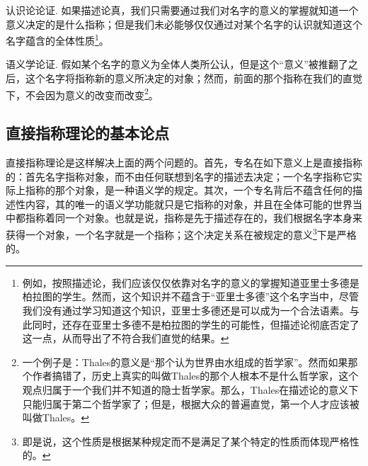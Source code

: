 \documentclass{article}
\begin{document}
{\kaishu 认识论论证.}  如果描述论真，我们只需要通过我们对名字的意义的掌握就知道一个意义决定的是什么指称；但是我们未必能够仅仅通过对某个名字的认识就知道这个名字蕴含的全体性质\footnote{例如，按照描述论，我们应该仅仅依靠对名字的意义的掌握知道亚里士多德是柏拉图的学生。然而，这个知识并不蕴含于“亚里士多德”这个名字当中，尽管我们没有通过学习知道这个知识，亚里士多德还是可以成为一个合法语素。与此同时，还存在亚里士多德不是柏拉图的学生的可能性，但描述论彻底否定了这一点，从而导出了不符合我们直觉的结果。}。

{\kaishu 语义学论证.} 
假如某个名字的意义为全体人类所公认，但是这个“意义”被推翻了之后，这个名字将指称新的意义所决定的对象；然而，前面的那个指称在我们的直觉下，不会因为意义的改变而改变\footnote{一个例子是：Thales的意义是“那个认为世界由水组成的哲学家”。然而如果那个作者搞错了，历史上真实的叫做Thales的那个人根本不是什么哲学家，这个观点归属于一个我们并不知道的隐士哲学家。那么，Thales在描述论的意义下只能归属于第二个哲学家了；但是，根据大众的普遍直觉，第一个人才应该被叫做Thales。}。

\subsection{直接指称理论的基本论点}
直接指称理论是这样解决上面的两个问题的。首先，专名在如下意义上是{\heiti 直接指称}的：首先名字指称对象，而不由任何联想到名字的描述去决定；一个名字指称它{\heiti 实际上}指称的那个对象，是一种语义学的规定。其次，一个专名背后不蕴含任何的描述性内容，其的唯一的语义学功能就只是它指称的对象，并且在全体可能的世界当中都指称着同一个对象。也就是说，指称是先于描述存在的，我们根据名字本身来获得一个对象，一个名字就是一个指称；这个决定关系在被规定的意义\footnote{即是说，这个性质是根据某种规定而不是满足了某个特定的性质而体现严格性的。}下是严格的。
\end{document}
